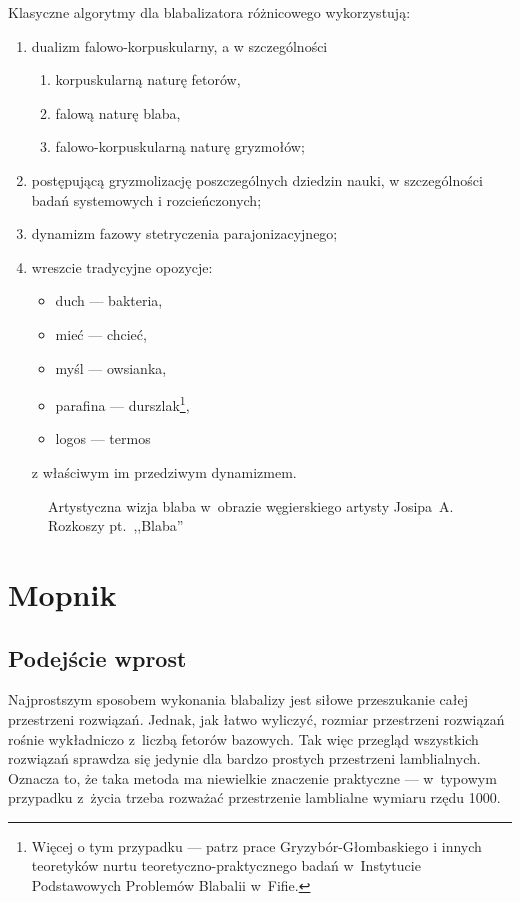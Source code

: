 Klasyczne algorytmy dla blabalizatora różnicowego wykorzystują:
\begin{enumerate}
\item dualizm falowo-korpuskularny, a w szczególności
  \begin{enumerate}
  \item korpuskularną naturę fetorów,
  \item falową naturę blaba,
  \item falowo-korpuskularną naturę gryzmołów;
  \end{enumerate}
\item postępującą gryzmolizację poszczególnych dziedzin nauki, w
  szczególności badań systemowych i rozcieńczonych;
\item dynamizm fazowy stetryczenia parajonizacyjnego;
\item wreszcie tradycyjne opozycje:
  \begin{itemize}
  \item duch --- bakteria,
  \item mieć --- chcieć,
  \item myśl --- owsianka,
  \item parafina --- durszlak\footnote{Więcej o tym przypadku --- patrz
      prace Gryzybór-Głombaskiego i innych teoretyków nurtu
      teoretyczno-praktycznego badań w~Instytucie Podstawowych
      Problemów Blabalii w~Fifie.},
  \item logos --- termos%
  \end{itemize}
  z właściwym im przedziwym dynamizmem.
\end{enumerate}

\begin{figure}[tp]
  \centering
  \caption{Artystyczna wizja blaba w~obrazie węgierskiego artysty
    Josipa~A. Rozkoszy pt.~,,Blaba''}
\end{figure}

\chapter{Mopnik}\label{r:mopnik}

\section{Podejście wprost}

Najprostszym sposobem wykonania blabalizy jest siłowe przeszukanie
całej przestrzeni rozwiązań.  Jednak, jak łatwo wyliczyć, rozmiar
przestrzeni rozwiązań rośnie wykładniczo z~liczbą fetorów bazowych.
Tak więc przegląd wszystkich rozwiązań sprawdza się jedynie dla bardzo
prostych przestrzeni lamblialnych.  Oznacza to, że taka metoda ma
niewielkie znaczenie praktyczne --- w~typowym przypadku z~życia trzeba
rozważać przestrzenie lamblialne wymiaru rzędu 1000.

